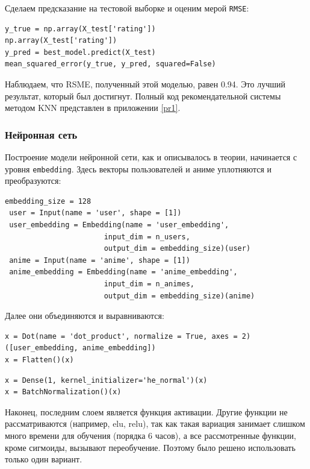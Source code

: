 \documentclass[bachelor, och, diploma]{SCWorks}
\begin{document}
Сделаем предсказание на тестовой выборке и оценим мерой \verb|RMSE|:

\begin{verbatim}
y_true = np.array(X_test['rating'])
np.array(X_test['rating'])
y_pred = best_model.predict(X_test)
mean_squared_error(y_true, y_pred, squared=False)
\end{verbatim}

Наблюдаем, что RSME, полученный этой моделью, равен 0.94. Это лучший результат, который был достигнут.
Полный код рекомендательной системы методом KNN представлен в приложении \ref{pr1}.
\subsubsection{Нейронная сеть}

Построение модели нейронной сети, как и описывалось в теории, начинается с уровня \verb|embedding|. Здесь векторы пользователей и аниме уплотняются и преобразуются: 

\begin{verbatim}
embedding_size = 128
 user = Input(name = 'user', shape = [1])
 user_embedding = Embedding(name = 'user_embedding',
                       input_dim = n_users, 
                       output_dim = embedding_size)(user)
 anime = Input(name = 'anime', shape = [1])
 anime_embedding = Embedding(name = 'anime_embedding',
                       input_dim = n_animes, 
                       output_dim = embedding_size)(anime)

\end{verbatim}

Далее они объединяются и выравниваются: 

\begin{verbatim}
x = Dot(name = 'dot_product', normalize = True, axes = 2)([user_embedding, anime_embedding])
x = Flatten()(x)
\end{verbatim}

\begin{verbatim}
x = Dense(1, kernel_initializer='he_normal')(x)
x = BatchNormalization()(x)
\end{verbatim}

Наконец, последним слоем является функция активации.  Другие функции не рассматриваются (например, elu, relu), так как такая вариация занимает слишком много времени для обучения (порядка 6 часов), а все рассмотренные функции, кроме сигмоиды, вызывают переобучение. Поэтому было решено использовать только один вариант.
\end{document}
